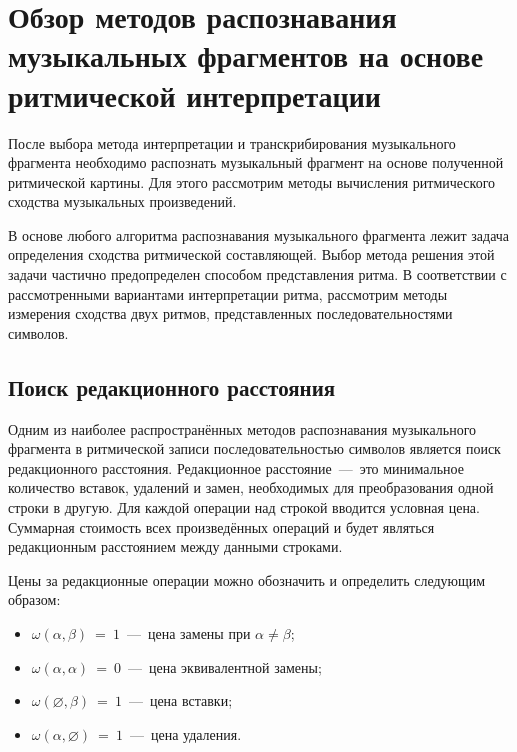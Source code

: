 \section{Обзор методов распознавания музыкальных фрагментов на основе ритмической интерпретации}

После выбора метода интерпретации и транскрибирования музыкального фрагмента необходимо распознать музыкальный фрагмент на основе полученной ритмической картины. Для этого рассмотрим методы вычисления ритмического сходства музыкальных произведений.

В основе любого алгоритма распознавания музыкального фрагмента лежит задача определения сходства ритмической составляющей. Выбор метода решения этой задачи частично предопределен способом представления ритма. В соответствии с рассмотренными вариантами интерпретации ритма, рассмотрим методы измерения сходства двух ритмов, представленных последовательностями символов.

\subsection{Поиск редакционного расстояния}

Одним из наиболее распространённых методов распознавания музыкального фрагмента в ритмической записи последовательностью символов является поиск редакционного расстояния. Редакционное расстояние~---~это минимальное количество вставок, удалений и замен, необходимых для преобразования одной строки в другую. Для каждой операции над строкой вводится условная цена. Суммарная стоимость всех произведённых операций и будет являться редакционным расстоянием между данными строками.

Цены за редакционные операции можно обозначить  и определить следующим образом:
\begin{itemize}
	\item $\omega(\alpha,\beta)~=~1$~---~цена замены при $\alpha \neq \beta$;
	\item $\omega(\alpha,\alpha)~=~0$~---~цена эквивалентной замены;
	\item $\omega(\varnothing,\beta)~=~1$~---~цена вставки;
	\item $\omega(\alpha,\varnothing)~=~1$~---~цена удаления.
\end{itemize}

